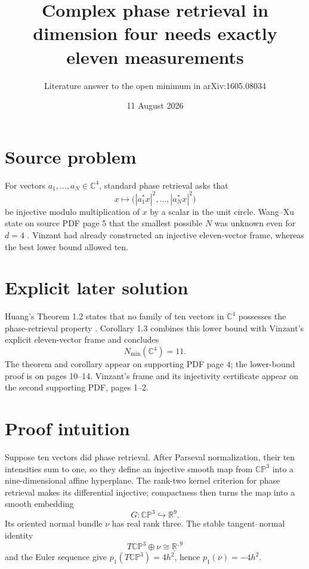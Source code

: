 \documentclass[11pt]{article}
\title{Complex phase retrieval in dimension four needs exactly eleven measurements}
\author{Literature answer to the open minimum in arXiv:1605.08034}
\date{11 August 2026}
\begin{document}
\maketitle

\begin{center}
\end{center}

\section*{Source problem}
For vectors $a_1,\dots,a_N\in\mathbb C^4$, standard phase retrieval asks that
\[
 x\longmapsto \bigl(|a_1^*x|^2,\dots,|a_N^*x|^2\bigr)
\]
be injective modulo multiplication of $x$ by a scalar in the unit circle.  Wang--Xu state on source PDF page 5 that the smallest possible $N$ was unknown even for $d=4$ \cite{WX}.  Vinzant had already constructed an injective eleven-vector frame, whereas the best lower bound allowed ten.

\section*{Explicit later solution}
Huang's Theorem 1.2 states that no family of ten vectors in $\mathbb C^4$ possesses the phase-retrieval property \cite{Huang}.  Corollary 1.3 combines this lower bound with Vinzant's explicit eleven-vector frame \cite{Vinzant} and concludes
\[
 N_{\min}(\mathbb C^4)=11.
\]
The theorem and corollary appear on supporting PDF page 4; the lower-bound proof is on pages 10--14.  Vinzant's frame and its injectivity certificate appear on the second supporting PDF, pages 1--2.

\section*{Proof intuition}
Suppose ten vectors did phase retrieval.  After Parseval normalization, their ten intensities sum to one, so they define an injective smooth map from $\mathbb{CP}^3$ into a nine-dimensional affine hyperplane.  The rank-two kernel criterion for phase retrieval makes its differential injective; compactness then turns the map into a smooth embedding
\[
 G:\mathbb{CP}^3\hookrightarrow\mathbb R^9.
\]
Its oriented normal bundle $\nu$ has real rank three.  The stable tangent--normal identity
\[
 T\mathbb{CP}^3\oplus\nu\cong\underline{\mathbb R}^{,9}
\]
and the Euler sequence give $p_1(T\mathbb{CP}^3)=4h^2$, hence $p_1(\nu)=-4h^2$.
\end{document}
